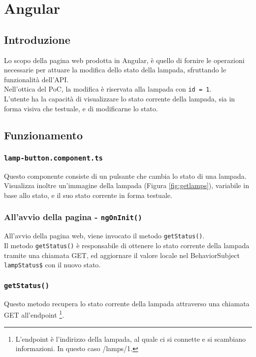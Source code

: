 \chapter{Angular}\label{angular}

\section{Introduzione}

Lo scopo della pagina web prodotta in Angular, è quello di fornire le operazioni necessarie per attuare la modifica dello stato della lampada, sfruttando le funzionalità dell'API. \\
Nell'ottica del PoC, la modifica è riservata alla lampada con \texttt{id = 1}. \\
L'utente ha la capacità di visualizzare lo stato corrente della lampada, sia in forma visiva che testuale, e di modificarne lo stato. 

\section{Funzionamento}

\subsection{\texttt{lamp-button.component.ts}}
Questo componente consiste di un pulsante che cambia lo stato di una lampada. Visualizza inoltre un'immagine della lampada (Figura \ref{fig:getlamps}), variabile in base allo stato, e il suo stato corrente in forma testuale.

\subsection{All'avvio della pagina - \texttt{ngOnInit()}}
All'avvio della pagina web, viene invocato il metodo \texttt{getStatus()}.\\
Il metodo \texttt{getStatus()} è responsabile di ottenere lo stato corrente della lampada tramite una chiamata GET, ed aggiornare il valore locale nel BehaviorSubject \texttt{lampStatus\$} con il nuovo stato.

\subsection{\texttt{getStatus()}}
Questo metodo recupera lo stato corrente della lampada attraverso una chiamata GET all'endpoint \footnote{L'endpoint è l'indirizzo della lampada, al quale ci si connette e si scambiano informazioni. In questo caso /lamps/1.}. \\

